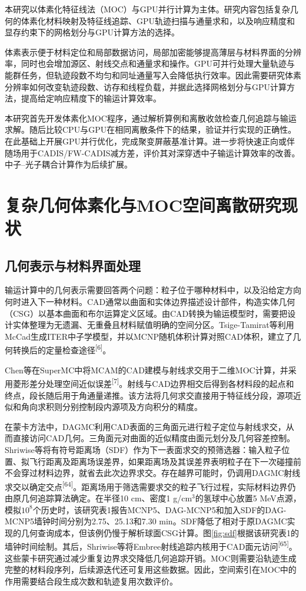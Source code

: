 \documentclass[UTF8, zihao=-4, fontset=none, a4paper]{ctexart}
\newcommand{\upcite}[1]{\textsuperscript{[#1]}}
\begin{document}
本研究以体素化特征线法（MOC）与GPU并行计算为主体。研究内容包括复杂几何的体素化材料映射及特征线追踪、GPU轨迹扫描与通量求和，以及响应精度和显存约束下的网格划分与GPU计算方法的选择。

体素表示便于材料定位和局部数据访问，局部加密能够提高薄层与材料界面的分辨率，同时也会增加源区、射线交点和通量求和操作。GPU可并行处理大量轨迹与能群任务，但轨迹段数不均匀和同址通量写入会降低执行效率。因此需要研究体素分辨率如何改变轨迹段数、访存和线程负载，并据此选择网格划分与GPU计算方法，提高给定响应精度下的输运计算效率。

本研究首先开发体素化MOC程序，通过解析算例和离散收敛检查几何追踪与输运求解。随后比较CPU与GPU在相同离散条件下的结果，验证并行实现的正确性。在此基础上开展GPU并行优化，完成聚变屏蔽基准计算。进一步将快速正向或伴随场用于CADIS/FW-CADIS减方差，评价其对深穿透中子输运计算效率的改善。中子--光子耦合计算作为后续扩展。

\section{复杂几何体素化与MOC空间离散研究现状}\label{sec:2}

\subsection{几何表示与材料界面处理}

输运计算中的几何表示需要回答两个问题：粒子位于哪种材料中，以及沿给定方向何时进入下一种材料。CAD通常以曲面和实体边界描述设计部件，构造实体几何（CSG）以基本曲面和布尔运算定义区域。由CAD转换为输运模型时，需要把设计实体整理为无遗漏、无重叠且材料赋值明确的空间分区。Tsige-Tamirat等利用McCad生成ITER中子学模型，并以MCNP随机体积计算对照CAD体积，建立了几何转换后的定量检查途径\upcite{6}。

Chen等在SuperMC中将MCAM的CAD建模与射线求交用于二维MOC计算，并采用菱形差分处理空间近似误差\upcite{7}。射线与CAD边界相交后得到各材料段的起点和终点，段长随后用于角通量递推。该方法将几何求交直接用于特征线分段，源项近似和角向求积则分别控制段内源项及方向积分的精度。

在蒙卡方法中，DAGMC利用CAD表面的三角面元进行粒子定位与射线求交，从而直接访问CAD几何。三角面元对曲面的近似精度由面元划分及几何容差控制。Shriwise等将有符号距离场（SDF）作为下一表面求交的预筛选器：输入粒子位置、拟飞行距离及距离场误差界，如果距离场及其误差界表明粒子在下一次碰撞前不会穿过材料边界，就省去此次边界求交。存在越界可能时，仍调用DAGMC射线求交以确定交点\upcite{64}。距离场用于筛选需要求交的粒子飞行过程，实际材料边界仍由原几何追踪算法确定。在半径10 cm、密度1 g/cm$^3$的氢球中心放置5 MeV点源，模拟$10^8$个历史时，该研究表1报告MCNP5、DAG-MCNP5和加入SDF的DAG-MCNP5墙钟时间分别为2.75、25.13和7.30 min。SDF降低了相对于原DAGMC实现的几何查询成本，但该例仍慢于解析球面CSG计算。图\ref{fig:sdf}根据该研究表1的墙钟时间绘制。其后，Shriwise等将Embree射线追踪内核用于CAD面元访问\upcite{65}。这些蒙卡研究通过减少重复边界求交降低几何追踪开销。MOC则需要沿轨迹生成完整的材料段序列，后续源迭代还可复用这些数据。因此，空间索引在MOC中的作用需要结合段生成次数和轨迹复用次数评价。
\end{document}
